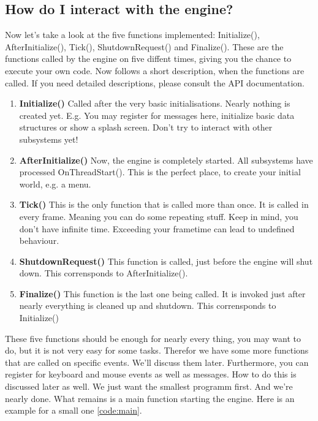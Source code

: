 \documentclass{article}
\begin{document}
\subsection{How do I interact with the engine?}


Now let's take a look at the five functions implemented: Initialize(), AfterInitialize(), Tick(), ShutdownRequest() and Finalize(). These are the functions called by the engine on five diffent times, giving you the chance to execute your own code. Now follows a short description, when the functions are called. If you need detailed descriptions, please consult the API documentation.
\begin{enumerate}
	\item \textbf{Initialize()} Called after the very basic initialisations. Nearly nothing is created yet. E.g. You may register for messages here, initialize basic data structures or show a splash screen. Don't try to interact with other subsystems yet!
	\item \textbf{AfterInitialize()} Now, the engine is completely started. All subsystems have processed OnThreadStart(). This is the perfect place, to create your initial world, e.g. a menu.
	\item \textbf{Tick()} This is the only function that is called more than once. It is called in every frame. Meaning you can do some repeating stuff. Keep in mind, you don't have infinite time. Exceeding your frametime can lead to undefined behaviour.
	\item \textbf{ShutdownRequest()} This function is called, just before the engine will shut down. This corrensponds to AfterInitialize().
	\item \textbf{Finalize()} This function is the last one being called. It is invoked just after nearly everything is cleaned up and shutdown. This corrensponds to Initialize()
\end{enumerate}
These five functions should be enough for nearly every thing, you may want to do, but it is not very easy for some tasks. Therefor we have some more functions that are called on specific events. We'll discuss them later. Furthermore, you can register for keyboard and mouse events as well as messages. How to do this is discussed later as well. We just want the smallest programm first. And we're nearly done. What remains is a main function starting the engine. Here is an example for a small one \ref{code:main}.

\end{document}
